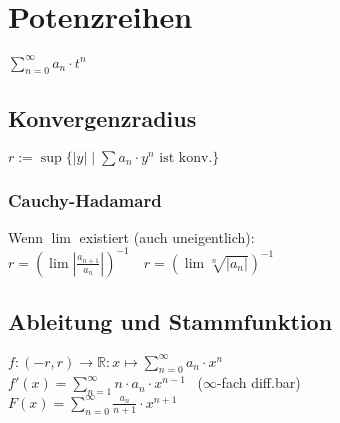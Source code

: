 \section*{Potenzreihen}
$\displaystyle \sum_{n=0}^\infty a_n\cdot t^n$

\subsection*{Konvergenzradius}
$r:=\sup\{|y|\mid \sum a_n\cdot y^n \text{ ist konv.}\}$

\subsubsection*{Cauchy-Hadamard}
Wenn $\lim$ existiert (auch uneigentlich):\\
$r=(\lim|\frac{a_{n+1}}{a_n}|)^{-1} \quad r=(\lim\sqrt[n]{|a_n|})^{-1}$

\subsection*{Ableitung und Stammfunktion}
$\displaystyle f: (-r,r)\to\mathbb{R}: x\mapsto\sum_{n=0}^\infty a_n\cdot x^n$ \\
$\displaystyle f'(x)=\sum_{n=1}^\infty n\cdot a_n\cdot x^{n-1}$ ~($\infty$-fach diff.bar) \\
$\displaystyle F(x)=\sum_{n=0}^\infty\frac{a_n}{n+1}\cdot x^{n+1}$
